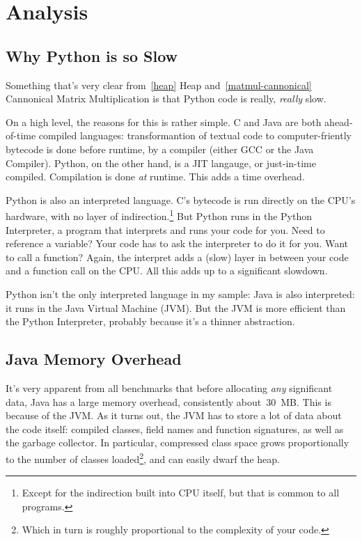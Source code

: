 \documentclass[12pt,letterpaper]{article}
\begin{document}
\section{Analysis}

\subsection{Why Python is so Slow}\label{python-slow}

Something that's very clear from~\ref{heap} Heap and~\ref{matmul-cannonical}
Cannonical Matrix Multiplication is that Python code is really, \emph{really}
slow.

On a high level, the reasons for this is rather simple. C and Java are both
ahead-of-time compiled languages: transformantion of textual code to
computer-friently bytecode is done before runtime, by a compiler (either GCC or
the Java Compiler). Python, on the other hand, is a JIT langauge, or
just-in-time compiled. Compilation is done \emph{at} runtime. This adds a time
overhead.

Python is also an interpreted language. C's bytecode is run directly on the
CPU's hardware, with no layer of indirection.\footnote{Except for the
indirection built into CPU itself, but that is common to all programs.} But
Python runs in the Python Interpreter, a program that interprets and runs your
code for you. Need to reference a variable? Your code has to ask the
interpreter to do it for you. Want to call a function? Again, the interpret
adds a (slow) layer in between your code and a function call on the CPU. All
this adds up to a significant slowdown.

Python isn't the only interpreted language in my sample: Java is also
interpreted: it runs in the Java Virtual Machine (JVM). But the JVM is more
efficient than the Python Interpreter, probably because it's a thinner
abstraction.

\subsection{Java Memory Overhead}

It's very apparent from all benchmarks that before allocating \emph{any}
significant data, Java has a large memory overhead, consistently
about~\SI{30}{\mega B}. This is because of the JVM. As it turns out, the JVM
has to store a lot of data about the code itself: compiled classes, field names
and function signatures, as well as the garbage collector. In particular,
compressed class space grows proportionally to the number of classes
loaded\footnote{Which in turn is roughly proportional to the complexity of your
code.}, and can easily dwarf the heap.
\end{document}
